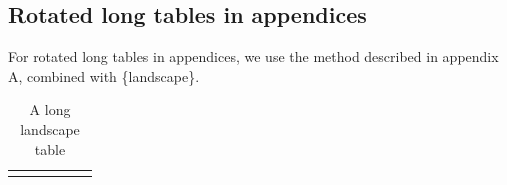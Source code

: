 \documentclass{aa}
\begin{document}
\begin{appendix}
	\FloatBarrier %
	\twocolumn
	\onecolumn
	\begin{landscape}
		\section{Rotated long tables in appendices}
		For rotated long tables in appendices, we use the method
		described in appendix A, combined with \{landscape\}.
		\begin{longtable}{lllrrr}

			\caption{A long landscape table}                              \\
			\hline\hline
			\label{lsltapp}


\end{longtable}
\end{landscape}
\end{appendix}
\end{document}
